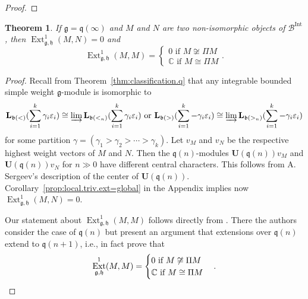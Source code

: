 \documentclass[12pt]{amsart}
\newcommand\C{\mathbb{C}}
\newcommand\g{\mathfrak{g}}
\newcommand\fq{\mathfrak{q}}
\newcommand\fh{\mathfrak{h}}
\newcommand\fb{\mathfrak{b}}
\newcommand\cB{\mathcal{B}}
\newcommand\bV{\mathbf{V}}
\newcommand\bU{\mathbf{U}}
\newcommand\bL{\mathbf{L}}
\DeclareMathOperator{\Hom}{Hom}
\DeclareMathOperator{\Ext}{Ext}
\DeclareMathOperator{\Int}{Int}
\theoremstyle{plain}
\newtheorem{theo}{Theorem}[section]
\theoremstyle{definition}
\numberwithin{equation}{section}
\begin{document}
\begin{proof}

\end{proof}

\begin{theo}\label{thm:B.C.D.sp.q-ss}
	If $\g = \fq(\infty)$ and $M$ and $N$ are two non-isomorphic objects of $\cB^{\Int}$, then $\Ext_{\g, \fh}^1 (M, N) = 0$ and \[ \Ext_{\g, \fh}^1 (M, M) = \begin{cases}
	0 \text{ if }M\not\cong\Pi M  \\
	\mathbb{C} \text{ if }M\cong\Pi M
	\end{cases}. \]
\end{theo}
\begin{proof}
	Recall from Theorem~\ref{thm:classification.q} that any integrable bounded simple weight $\g$-module is isomorphic to
	\[
	\bL_{\fb(<)} (\sum_{i=1}^k \gamma_i\varepsilon_i)\cong \varinjlim \bL_{\fb(<_n)} (\sum_{i=1}^k \gamma_i\varepsilon_i) \text{ or } \bL_{\fb(>)} (\sum_{i=1}^k -\gamma_i\varepsilon_i)\cong \varinjlim \bL_{\fb(>_n)} (\sum_{i=1}^k -\gamma_i\varepsilon_i)
	\]
	for some partition $\gamma = (\gamma_1> \gamma_2> \cdots > \gamma_k)$. Let $v_M$ and $v_N$ be the respective highest weight vectors of $M$ and $N$. Then the $\fq(n)$-modules $\bU(\fq(n))v_M$ and $\bU(\fq(n))v_N$ for $n\gg 0$ have different central characters. This follows from A. Sergeev's description \cite{Ser83} of the center of $\bU(\fq(n))$. Corollary~\ref{prop:local.triv.ext=global} in the Appendix implies now $\Ext_{\g, \fh}^1 (M, N) = 0$.
	
Our statement about $\Ext_{\g, \fh}^1 (M, M)$ follows directly from \cite{GS20}. There the authors consider the case of $\fq(n)$ but present an argument that extensions over $\fq(n)$ extend to $\fq(n+1)$, i.e., in fact prove that 
	\[
\Ext_{\g, \fh}^1 (M, M) = \begin{cases}
0 \text{ if }M\not\cong\Pi M  \\
\mathbb{C} \text{ if }M\cong\Pi M
\end{cases}. \qedhere
	\]
\end{proof}
\end{document}
